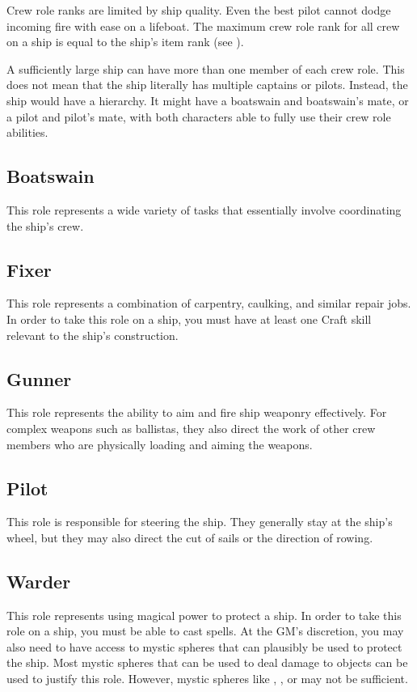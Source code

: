     Crew role ranks are limited by ship quality.
    Even the best pilot cannot dodge incoming fire with ease on a lifeboat.
    The maximum crew role rank for all crew on a ship is equal to the ship's item rank (see ).

    A sufficiently large ship can have more than one member of each crew role.
    This does not mean that the ship literally has multiple captains or pilots.
    Instead, the ship would have a hierarchy.
    It might have a boatswain and boatswain's mate, or a pilot and pilot's mate, with both characters able to fully use their crew role abilities.

    \subsection{Boatswain}
        This role represents a wide variety of tasks that essentially involve coordinating the ship's crew.

    \subsection{Fixer}
        This role represents a combination of carpentry, caulking, and similar repair jobs.
        In order to take this role on a ship, you must have at least one Craft skill relevant to the ship's construction.

    \subsection{Gunner}
        This role represents the ability to aim and fire ship weaponry effectively.
        For complex weapons such as ballistas, they also direct the work of other crew members who are physically loading and aiming the weapons.

    \subsection{Pilot}
        This role is responsible for steering the ship.
        They generally stay at the ship's wheel, but they may also direct the cut of sails or the direction of rowing.

    \subsection{Warder}
        This role represents using magical power to protect a ship.
        In order to take this role on a ship, you must be able to cast spells.
        At the GM's discretion, you may also need to have access to mystic spheres that can plausibly be used to protect the ship.
        Most mystic spheres that can be used to deal damage to objects can be used to justify this role.
        However, mystic spheres like , , or  may not be sufficient.

